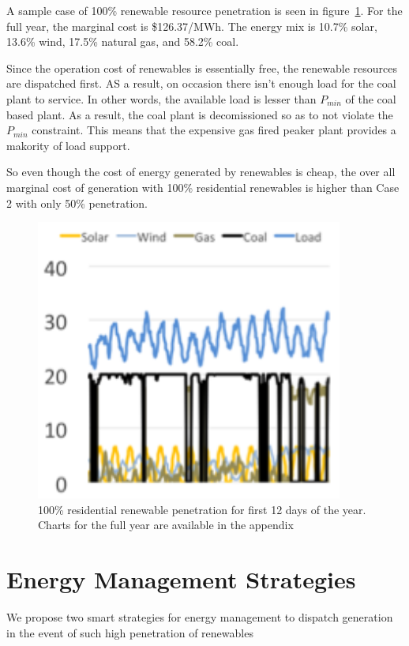 \documentclass[a4paper]{article}
\begin{document}
A sample case of 100\% renewable resource penetration is seen in figure~\ref{fig:FIG6}. For the full year, the marginal cost is \$126.37/MWh. The energy mix is 10.7\% solar, 13.6\% wind, 17.5\% natural gas, and 58.2\% coal.

Since the operation cost of renewables is essentially free, the renewable resources are dispatched first. AS a result, on occasion there isn't enough load for the coal plant to service. In other words, the available load is lesser than $P_{min}$ of the coal based plant. As a result, the coal plant is decomissioned so as to not violate the $P_{min}$ constraint. This means that the expensive gas fired peaker plant provides a makority of load support.  

So even though the cost of energy generated by renewables is cheap, the over all marginal cost of generation with 100\% residential renewables is higher than Case 2 with only 50\% penetration.  

\begin{figure}
\centering
\includegraphics[width=0.9\textwidth , height=0.25\textheight]{FIG6.png}
\caption{\label{fig:FIG6}100\% residential renewable penetration for first 12 days of the year. Charts for the full year are available in the appendix}
\end{figure}

\section{Energy Management Strategies}
We propose two smart strategies for energy management to dispatch generation in the event of such high penetration of renewables
\end{document}
